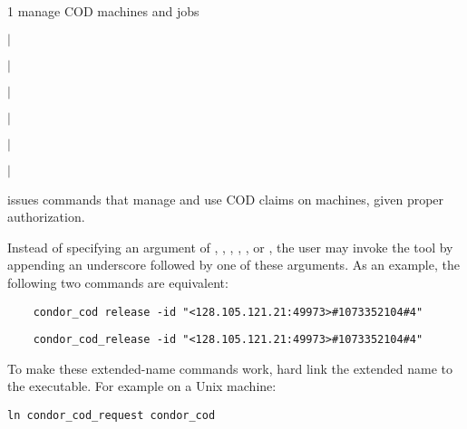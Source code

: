 \begin{ManPage}{\label{man-condor-cod}}{1}
{manage COD machines and jobs}

\Synopsis
{}
\ToolArgsBase

\ToolLocate
\Lbr {} $|$  \Rbr
{}

 
\Lbr {} $|$  \Rbr
{}

 
\Lbr {} $|$  \Rbr
{}

 
\Lbr {} $|$  \Rbr
{}

 
\Lbr {} $|$  \Rbr

 
\Lbr {} $|$  \Rbr


\Description

 issues commands that manage and use COD claims on
machines, given proper authorization.

Instead of specifying an argument of
, , , , ,
or ,
the user may invoke the  tool by appending an
underscore followed by one of these arguments.
As an example, the following two commands are equivalent:
\begin{verbatim}
    condor_cod release -id "<128.105.121.21:49973>#1073352104#4"
\end{verbatim}
\begin{verbatim}
    condor_cod_release -id "<128.105.121.21:49973>#1073352104#4"
\end{verbatim}
To make these extended-name commands work,
hard link  the extended name to the  executable.
For example on a Unix machine:
\begin{verbatim}
ln condor_cod_request condor_cod
\end{verbatim}


\end{ManPage}

